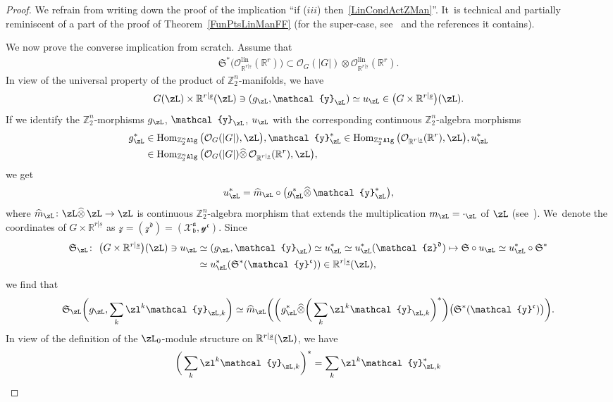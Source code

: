 \documentclass[pdftex]{sigma}%
\newcommand{\op}[1]{\operatorname{#1}}
\newcommand{\R}{{\mathbb R}}
\newcommand{\Z}{{\mathbb Z}}
\def\ul{\underline}
\def\cO{\mathcal{O}}
\def\ul{\underline}
\newcommand{\0}{\otimes}
\newcommand{\z}{\Z_2^n}
\numberwithin{equation}{section}
\begin{document}
\begin{proof}
We refrain from writing down the proof of the implication ``if ($iii$) then~\eqref{LinCondActZMan}''. It~is technical and partially reminiscent of a part of the proof of Theorem~\ref{FunPtsLinManFF} (for the super-case, see~\cite{Carmeli:2018} and the references it contains).

We now prove the converse implication from scratch. Assume that
\begin{gather}\label{LinAssumption}
\mathfrak{S}^*\big(\cO_{\R^{r|\ul s}}^{\op{lin}}(\R^r)\big)\subset \cO_{G}(|G|)\otimes\cO_{\R^{r|\ul s}}^{\op{lin}}(\R^r).
\end{gather}
In view of the universal property of the product of $\z$-manifolds, we have
\[
G(\zL)\times \R^{r|\ul s}(\zL)\ni(g_\zL,\mathcal{y}_\zL)\simeq u_\zL\in\big(G\times \R^{r|\ul s}\big)(\zL).
\]
If we identify the $\z$-morphisms $g_\zL$, $\mathcal{y}_\zL$, $u_\zL$ with the corresponding continuous $\z$-algebra morphisms
\begin{align*}
g_\zL^*&\in\op{Hom}_{\z\tt Alg}\big(\cO_G(|G|),\zL\big),\mathcal{y}^*_\zL
\in\op{Hom}_{\z\tt Alg}\big(\cO_{\R^{r|\ul s}}(\R^r),\zL\big),u_\zL^*
\\
&\in\op{Hom}_{\z\tt Alg}\big(\cO_G(|G|)\widehat{\0}\,\cO_{\R^{r|\ul s}}(\R^r),\zL\big),
\end{align*}
we get
\[
u_\zL^*=\widehat{m}_\zL\circ\big(g_\zL^*\widehat\0\,\mathcal{y}_\zL^*\big),
\]
where $\widehat{m}_\zL\colon \zL\widehat{\0}\,\zL\to\zL$ is continuous $\z$-algebra morphism that extends the multiplication \mbox{$m_\zL=\cdot_\zL$} of $\zL$ (see~\cite{Bruce:2019}). We~denote the coordinates of $G\times \R^{r|\ul s}$ as $\mathcal{z}=(\mathcal{z}^{\mathfrak{d}})=(\mathcal{X}^{\mathfrak{a}}_{\mathfrak{b}},\mathcal{y}^{\mathfrak{c}})$. Since
\begin{align*}
\mathfrak{S}_\zL\colon\ \big(G\times\R^{r|\ul s}\big)(\zL)\ni u_\zL&\simeq (g_\zL,\mathcal{y}_\zL)\simeq u^*_\zL\simeq u^*_\zL(\mathcal{z}^{\mathfrak{d}})\mapsto \mathfrak{S}\circ u_\zL\simeq u_\zL^*\circ\mathfrak{S}^*
\\
&\simeq u_\zL^*(\mathfrak{S}^*(\mathcal{y}^{\mathfrak{c}}))\in\R^{r|\ul s}(\zL),
\end{align*}
we find that
\[
\mathfrak{S}_\zL\bigg(g_\zL,\sum_k\zl^k\mathcal{y}_{\zL,k}\bigg)\simeq\widehat{m}_\zL \bigg(\bigg(g_\zL^*\widehat{\0}\bigg(\sum_k\zl^k\mathcal{y}_{\zL,k}\bigg)^*\bigg)\big(\mathfrak{S}^*
(\mathcal{y}^{\mathfrak{c}})\big)\bigg).
\]
In view of the definition of the $\zL_0$-module structure on $\R^{r|\ul s}(\zL)$, we have
\[
\bigg(\sum_k\zl^k\mathcal{y}_{\zL,k}\bigg)^*=\sum_k\zl^k\mathcal{y}_{\zL,k}^*
\]
\end{proof}
\end{document}
